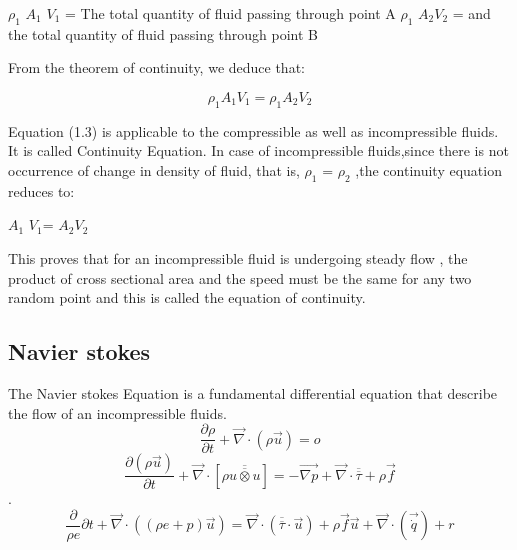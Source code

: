 \documentclass[a4paper, 12pt]{report}
\begin{document}
		$\rho_1$ $A_1$ $V_1$ = The total quantity of fluid passing through point A \newline
		$\rho_1$ $A_2V_2$ = and the total quantity of fluid passing through point B \newline
		\begin{center}
			From the theorem of continuity, we deduce that:
		\end{center}
		\begin{center}
			
			\begin{equation}
				\rho_1 A_1 V_1 = \rho_1 A_2V_2 
			\end{equation}
			
		\end{center}
		Equation (1.3) is applicable to the compressible as well as incompressible fluids. It is called Continuity Equation. In case of incompressible fluids,since there is not occurrence of change in density of fluid, that is, $\rho_1$ = $\rho_2$
		,the continuity equation reduces to:
		\begin{center}
			$A_1$ $V_1$= $A_2V_2$
		\end{center}
This proves that for an incompressible fluid is undergoing steady flow , the product of cross sectional area and the speed must be the same for any two random point and this is called the equation of continuity.

\subsection{Navier stokes}

The Navier stokes Equation is a fundamental differential equation that describe the flow of an incompressible fluids.
 \begin{equation}
 	\frac{\partial \rho}{\partial t} + \overrightarrow{\nabla} \cdot(\rho \overrightarrow{u}) =o
 \end{equation}
\begin{equation}
	\frac{\partial(\rho \overrightarrow{u})}{\partial t} + \overrightarrow{\nabla} \cdot[\rho\overline{\overline{u\otimes u}}] = -\overrightarrow{\nabla p} + \overrightarrow{\nabla} \cdot\overline{\overline{\tau}} + \rho\overrightarrow{f}
\end{equation}.
\begin{equation}
	\frac{\partial}{\rho e}{\partial t} + \overrightarrow{\nabla} \cdot ((\rho e + p)\overrightarrow{u}) = \overrightarrow{\nabla} \cdot (\overline{\overline{\tau}}\cdot \overrightarrow{u}) + \rho\overrightarrow{f} \overrightarrow{u} + \overrightarrow{\nabla}\cdot(\overrightarrow{\dot{q}}) + r
\end{equation}
\end{document}
